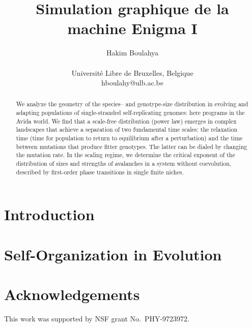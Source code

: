 \documentclass[letterpaper]{article}
\title{Simulation graphique de la machine Enigma I}
\author{Hakim Boulahya \\
\mbox{}\\
Université Libre de Bruxelles, Belgique\\
hboulahy@ulb.ac.be}
\begin{document}
\maketitle

\begin{abstract}
  We analyze the geometry of the species-- and genotype-size
  distribution in evolving and adapting populations of single-stranded
  self-replicating genomes: here programs in the Avida world.  We find
  that a scale-free distribution (power law) emerges in complex
  landscapes that achieve a separation of two fundamental time scales:
  the relaxation time (time for population to return to equilibrium
  after a perturbation) and the time between mutations that produce
  fitter genotypes. The latter can be dialed by changing the mutation
  rate.  In the scaling regime, we determine the
  critical exponent of the distribution of sizes and strengths of
  avalanches in a system without coevolution, described by first-order
  phase transitions in single finite niches.
\end{abstract}

\section{Introduction}
\section{Self-Organization in Evolution}

\section{Acknowledgements}

This work was supported by NSF grant No.\ PHY-9723972.

\footnotesize


\end{document}
